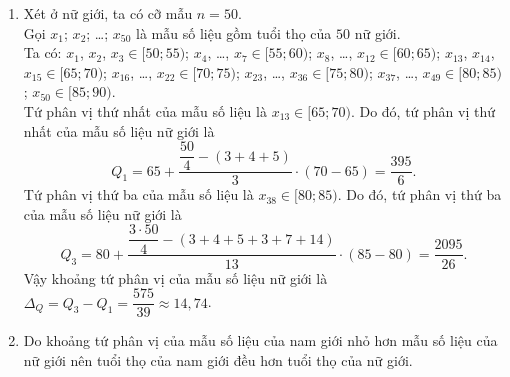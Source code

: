 \begin{ex}
{\begin{enumerate}
			Gọi $x_1$; $x_2$; \ldots; $x_{50}$ là mẫu số liệu gồm tuổi thọ của $50$ nam giới.\\
			Ta có: $x_1$, \ldots, $x_4\in[50;55)$; $x_5$, \ldots, $x_{11}\in[55;60)$; $x_{12}$, \ldots, $x_{15}\in[60;65)$; $x_{16}$, \ldots, $x_{21}\in[65;70)$; $x_{22}$, \ldots, $x_{36}\in[70;75)$; $x_{37}$, \ldots, $x_{48}\in[75;80)$; $x_{49}$, $x_{50}\in[80;85)$.\\
			Tứ phân vị thứ nhất của mẫu số liệu là $x_{13}\in[60;65)$. Do đó, tứ phân vị thứ nhất của mẫu số liệu nam giới là
			$$Q_1=60+\dfrac{\dfrac{50}{4}-(4+7)}{4}\cdot(65-60)=\dfrac{495}{8}.$$
			Tứ phân vị thứ ba của mẫu số liệu là $x_{38}\in[75;80)$. Do đó, tứ phân vị thứ ba của mẫu số liệu nam giới là
			$$Q_3=75+\dfrac{\dfrac{3\cdot50}{4}-(4+7+4+6+15)}{12}\cdot(80-75)=\dfrac{605}{8}.$$
			Vậy khoảng tứ phân vị của mẫu số liệu nam giới là $\Delta_Q=Q_3-Q_1=\dfrac{55}{4}=13{,}75$.
			\item Xét ở nữ giới, ta có cỡ mẫu $n=50$.\\
			Gọi $x_1$; $x_2$; \ldots; $x_{50}$ là mẫu số liệu gồm tuổi thọ của $50$ nữ giới.\\
			Ta có: $x_1$, $x_2$, $x_3\in[50;55)$; $x_4$, \ldots, $x_7\in[55;60)$; $x_8$, \ldots, $x_{12}\in[60;65)$; $x_{13}$, $x_{14}$, $x_{15}\in[65;70)$; $x_{16}$, \ldots, $x_{22}\in[70;75)$; $x_{23}$, \ldots, $x_{36}\in[75;80)$; $x_{37}$, \ldots, $x_{49}\in[80;85)$; $x_{50}\in[85;90)$.\\
			Tứ phân vị thứ nhất của mẫu số liệu là $x_{13}\in[65;70)$. Do đó, tứ phân vị thứ nhất của mẫu số liệu nữ giới là
			$$Q_1=65+\dfrac{\dfrac{50}{4}-(3+4+5)}{3}\cdot(70-65)=\dfrac{395}{6}.$$
			Tứ phân vị thứ ba của mẫu số liệu là $x_{38}\in[80;85)$. Do đó, tứ phân vị thứ ba của mẫu số liệu nữ giới là
			$$Q_3=80+\dfrac{\dfrac{3\cdot50}{4}-(3+4+5+3+7+14)}{13}\cdot(85-80)=\dfrac{2095}{26}.$$
			Vậy khoảng tứ phân vị của mẫu số liệu nữ giới là $\Delta_Q=Q_3-Q_1=\dfrac{575}{39}\approx14{,}74$.
			\item Do khoảng tứ phân vị của mẫu số liệu của nam giới nhỏ hơn mẫu số liệu của nữ giới nên tuổi thọ của nam giới đều hơn tuổi thọ của nữ giới.
	\end{enumerate}}
\end{ex}


